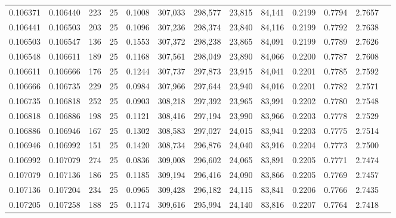 \begin{tabular}{rrrrrrrrrrrrr}
0.106371 & 0.106440 &   223 &  25 &                                     0.1008 & 307,033 & 298,577 &  23,815 &  84,141 & 0.2199 & 0.7794 & 2.7657 \\
0.106441 & 0.106503 &   203 &  25 &                                     0.1096 & 307,236 & 298,374 &  23,840 &  84,116 & 0.2199 & 0.7792 & 2.7638 \\
0.106503 & 0.106547 &   136 &  25 &                                     0.1553 & 307,372 & 298,238 &  23,865 &  84,091 & 0.2199 & 0.7789 & 2.7626 \\
0.106548 & 0.106611 &   189 &  25 &                                     0.1168 & 307,561 & 298,049 &  23,890 &  84,066 & 0.2200 & 0.7787 & 2.7608 \\
0.106611 & 0.106666 &   176 &  25 &                                     0.1244 & 307,737 & 297,873 &  23,915 &  84,041 & 0.2201 & 0.7785 & 2.7592 \\
0.106666 & 0.106735 &   229 &  25 &                                     0.0984 & 307,966 & 297,644 &  23,940 &  84,016 & 0.2201 & 0.7782 & 2.7571 \\
0.106735 & 0.106818 &   252 &  25 &                                     0.0903 & 308,218 & 297,392 &  23,965 &  83,991 & 0.2202 & 0.7780 & 2.7548 \\
0.106818 & 0.106886 &   198 &  25 &                                     0.1121 & 308,416 & 297,194 &  23,990 &  83,966 & 0.2203 & 0.7778 & 2.7529 \\
0.106886 & 0.106946 &   167 &  25 &                                     0.1302 & 308,583 & 297,027 &  24,015 &  83,941 & 0.2203 & 0.7775 & 2.7514 \\
0.106946 & 0.106992 &   151 &  25 &                                     0.1420 & 308,734 & 296,876 &  24,040 &  83,916 & 0.2204 & 0.7773 & 2.7500 \\
0.106992 & 0.107079 &   274 &  25 &                                     0.0836 & 309,008 & 296,602 &  24,065 &  83,891 & 0.2205 & 0.7771 & 2.7474 \\
0.107079 & 0.107136 &   186 &  25 &                                     0.1185 & 309,194 & 296,416 &  24,090 &  83,866 & 0.2205 & 0.7769 & 2.7457 \\
0.107136 & 0.107204 &   234 &  25 &                                     0.0965 & 309,428 & 296,182 &  24,115 &  83,841 & 0.2206 & 0.7766 & 2.7435 \\
0.107205 & 0.107258 &   188 &  25 &                                     0.1174 & 309,616 & 295,994 &  24,140 &  83,816 & 0.2207 & 0.7764 & 2.7418 \\

\end{tabular}
